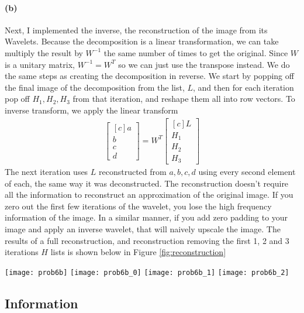 \documentclass{article}
\newcommand{\info}{\clearpage \subsection*{Information}}
\newcommand{\spart}[1]{\paragraph{(#1)}}
\begin{document}
\spart{b} Next, I implemented the inverse, the reconstruction of the image from its Wavelets. Because the decomposition is a linear transformation, we can take multiply the result by $W^{-1}$ the same number of times to get the original. Since $W$ is a unitary matrix, $W^{-1} = W^T$ so we can just use the transpose instead. We do the same steps as creating the decomposition in reverse. We start by popping off the final image of the decomposition from the list, $L$, and then for each iteration pop off $H_1,H_2,H_3$ from that iteration, and reshape them all into row vectors. To inverse transform, we apply the linear transform
\begin{align}
	\begin{bmatrix*}[c]
		a \\ b \\ c \\ d
	\end{bmatrix*} = W^T \begin{bmatrix*}[c]
	L \\ H_1 \\ H_2 \\ H_3
\end{bmatrix*}
\end{align}
The next iteration uses $L$ reconstructed from $a,b,c,d$ using every second element of each, the same way it was deconstructed. The reconstruction doesn't require all the information to reconstruct an approximation of the original image. If you zero out the first few iterations of the wavelet, you lose the high frequency information of the image. In a similar manner, if you add zero padding to your image and apply an inverse wavelet, that will naively upscale the image. The results of a full reconstruction, and reconstruction removing the first 1, 2 and 3 iterations $H$ lists is shown below in Figure \ref{fig:reconstruction}
\begin{figure*}[!h]
	\centering
	\texttt{[image: prob6b]}
	\texttt{[image: prob6b\_0]}
	\texttt{[image: prob6b\_1]}
	\texttt{[image: prob6b\_2]}
	\caption{Harr Wavelet Reconstruction with full information, and missing 1, 2 and 3 iterations of $H$ data (reading across)}
	\label{fig:reconstruction}
\end{figure*}

\info
\end{document}
